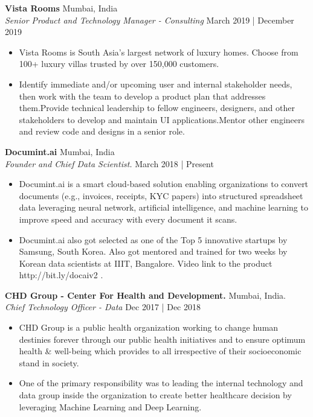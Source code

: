 \documentclass[a4paper]{article}
\begin{document}
\textbf{Vista Rooms} \hfill Mumbai, India\\
\textit{Senior Product and Technology Manager - Consulting} \hfill March 2019 | December 2019\\
\vspace{-1mm}
\begin{itemize} \itemsep 1pt
	\item Vista Rooms is South Asia's largest network of luxury homes. Choose from 100+ luxury villas trusted by over 150,000 customers.
	\item Identify immediate and/or upcoming user and internal stakeholder needs, then work with the team to develop a product plan that addresses them.Provide technical leadership to fellow engineers, designers, and other stakeholders to develop and maintain UI applications.Mentor other engineers and review code and designs in a senior role.
\end{itemize}
\textbf{Documint.ai} \hfill Mumbai, India\\
\textit{Founder and Chief Data Scientist.} \hfill March 2018 | Present\\
\vspace{-1mm}
\begin{itemize} \itemsep 1pt
	\item Documint.ai is a smart cloud-based solution enabling organizations to convert documents (e.g., invoices, receipts, KYC papers) into structured spreadsheet data leveraging neural network, artificial intelligence, and machine learning to improve speed and accuracy with every document it scans.
	\item Documint.ai also got selected as one of the Top 5 innovative startups by Samsung, South Korea. Also got mentored and trained for two weeks by Korean data scientists at IIIT, Bangalore. Video link to the product http://bit.ly/docaiv2 .
\end{itemize}
\textbf{CHD Group - Center For Health and Development.} \hfill Mumbai, India.\\
\textit{Chief Technology Officer - Data} \hfill Dec 2017 | Dec 2018\\
\vspace{-1mm}
\begin{itemize} \itemsep 1pt
	\item CHD Group is a public health organization working to change human destinies forever through our public health initiatives and to ensure optimum health \& well-being which provides to all irrespective of their socioeconomic stand in society.
	\item One of the primary responsibility was to leading the internal technology and data group inside the organization to create better healthcare decision by leveraging Machine Learning and Deep Learning.
\end{itemize}
\end{document}

